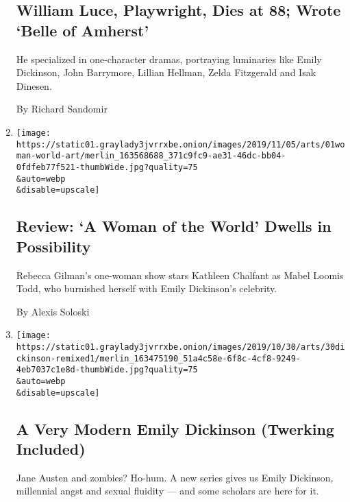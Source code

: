 \begin{enumerate}
  \hypertarget{william-luce-playwright-dies-at-88-wrote-belle-of-amherst}{%
  \subsection{William Luce, Playwright, Dies at 88; Wrote `Belle of
  Amherst'}\label{william-luce-playwright-dies-at-88-wrote-belle-of-amherst}}

  He specialized in one-character dramas, portraying luminaries like
  Emily Dickinson, John Barrymore, Lillian Hellman, Zelda Fitzgerald and
  Isak Dinesen.

  By Richard Sandomir
\item
  \href{/2019/11/01/theater/a-woman-of-the-world-review.html}{}

  \texttt{[image: https://static01.graylady3jvrrxbe.onion/images/2019/11/05/arts/01woman-world-art/merlin\_163568688\_371c9fc9-ae31-46dc-bb04-0fdfeb77f521-thumbWide.jpg?quality=75\\\&auto=webp\\\&disable=upscale]}

  \hypertarget{review-a-woman-of-the-world-dwells-in-possibility}{%
  \subsection{Review: `A Woman of the World' Dwells in
  Possibility}\label{review-a-woman-of-the-world-dwells-in-possibility}}

  Rebecca Gilman's one-woman show stars Kathleen Chalfant as Mabel
  Loomis Todd, who burnished herself with Emily Dickinson's celebrity.

  By Alexis Soloski
\item
  \href{/2019/10/30/arts/television/emily-dickinson-apple.html}{}

  \texttt{[image: https://static01.graylady3jvrrxbe.onion/images/2019/10/30/arts/30dickinson-remixed1/merlin\_163475190\_51a4c58e-6f8c-4cf8-9249-4eb7037c1e8d-thumbWide.jpg?quality=75\\\&auto=webp\\\&disable=upscale]}

  \hypertarget{a-very-modern-emily-dickinson-twerking-included}{%
  \subsection{A Very Modern Emily Dickinson (Twerking
  Included)}\label{a-very-modern-emily-dickinson-twerking-included}}

  Jane Austen and zombies? Ho-hum. A new series gives us Emily
  Dickinson, millennial angst and sexual fluidity --- and some scholars
  are here for it.


\end{enumerate}
